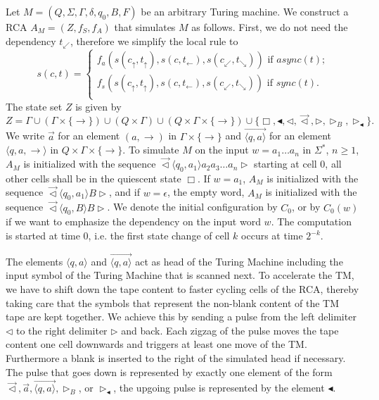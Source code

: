 \documentclass[pre,amssymb,showpacs,showkeys,preprint]{revtex4}
\begin{document}
Let $M = (Q, \Sigma, \Gamma, \delta, q_0, B, F)$ be an arbitrary Turing machine.
We construct a RCA $A_M = (Z, f_S, f_A)$ that simulates $M$ as follows.
First, we do not need the dependency $t_\swarrow$, therefore we simplify the local rule to
\begin{equation}
s(c,t) = \left\{
\begin{array}{l}
f_{a}(
        s(c_\uparrow, t_\uparrow),
        s(c, t_\leftarrow),
        s(c_\swarrow, t_\searrow)
) \mbox{  if $\mathit{async}(t)$;} \\
f_{s}(
        s(c_\uparrow, t_\uparrow),
        s(c, t_\leftarrow),
        s(c_\swarrow, t_\searrow)
) \mbox{  if $\mathit{sync}(t)$.} \\
\end{array}
\right.
\end{equation}
The state set $Z$ is given by
\[
Z = \Gamma \cup (\Gamma \times \{\rightarrow\}) \cup (Q \times \Gamma)
\cup (Q \times \Gamma \times \{\rightarrow\}) \cup
\{\Box, \blacktriangleleft, \lhd, \vec{\lhd}, \rhd, \rhd_B, \rhd_\blacktriangleleft\}.
\]
We write $\overrightarrow{a}$ for an element $(a, \rightarrow)$ in $\Gamma \times \{\rightarrow\}$
and $\overrightarrow{\langle q,a \rangle}$ for an element
$\langle q, a, \rightarrow \rangle$ in $Q \times \Gamma \times \{\rightarrow\}$.
To simulate $M$ on the input $w=a_1 \ldots a_n$ in $\Sigma^*$, $n \geq 1$,
$A_M$ is initialized with the sequence
$\overrightarrow{\lhd} \langle q_0,a_1 \rangle a_2 a_3\ldots a_n\rhd $
starting at cell 0, all other cells shall be in the quiescent state $\Box$.
If $w=a_1$, $A_M$ is initialized with the sequence
$\overrightarrow{\lhd} \langle q_0,a_1 \rangle B\rhd $, and
if $w=\epsilon$, the empty word, $A_M$ is initialized with the sequence
$\overrightarrow{\lhd} \langle q_0,B \rangle B\rhd $.
We denote the initial configuration by $C_0$, or by $C_0(w)$ if we want to emphasize the dependency on the input word $w$.
The computation is started at time 0, i.e. the first state change of cell $k$ occurs at time $2^{-k}$.

The elements $\langle q, a \rangle$ and $\overrightarrow{\langle q, a \rangle}$  act as head of the
Turing Machine including the input symbol of the Turing Machine that is scanned next.
To accelerate the TM, we have to shift down the tape content to faster cycling cells of the RCA,
thereby taking care that the symbols that represent the non-blank content of the TM tape are kept together.
We achieve this by sending a pulse from the left delimiter $\lhd$ to the right delimiter $\rhd$ and back.
Each zigzag of the pulse moves the tape content one cell downwards and triggers
at least one move of the TM.
Furthermore a blank is inserted to the right of the simulated head if necessary.
The pulse that goes down is represented by exactly one element of the form
$\overrightarrow{\lhd}, \overrightarrow{a}, \overrightarrow{\langle q,a \rangle}, \rhd_B$, or $\rhd_\blacktriangleleft$,
the upgoing pulse is represented by the element $\blacktriangleleft$.
\end{document}
